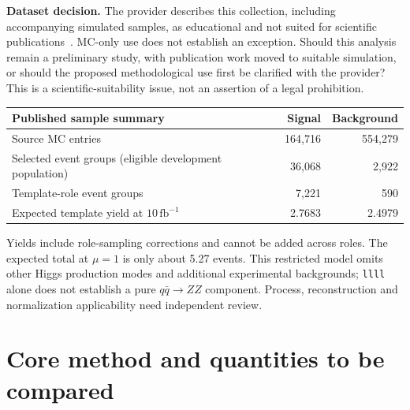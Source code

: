 \documentclass[11pt,a4paper]{article}
\begin{document}
\textbf{Dataset decision.} The provider describes this collection, including
accompanying simulated samples, as educational and not suited for scientific
publications~\cite{data}. MC-only use does not establish an exception.
Should this analysis remain a preliminary study, with publication work moved
to suitable simulation, or should the proposed methodological use first be
clarified with the provider? This is a scientific-suitability issue, not an
assertion of a legal prohibition.

\begin{center}
\begin{tabular}{lrr}
\toprule
Published sample summary & Signal & Background\\
\midrule
Source MC entries & 164,716 & 554,279\\
Selected event groups (eligible development population) & 36,068 & 2,922\\
Template-role event groups & 7,221 & 590\\
Expected template yield at $10\,\mathrm{fb}^{-1}$ & 2.7683 & 2.4979\\
\bottomrule
\end{tabular}
\end{center}
Yields include role-sampling corrections and cannot be added across roles.
The expected total at $\mu=1$ is only about 5.27 events. This restricted model
omits other Higgs production modes and additional experimental backgrounds;
\texttt{llll} alone does not establish a pure $q\bar q\to ZZ$ component.
Process, reconstruction and normalization applicability need independent review.

\newpage
\section{Core method and quantities to be compared}
\end{document}
